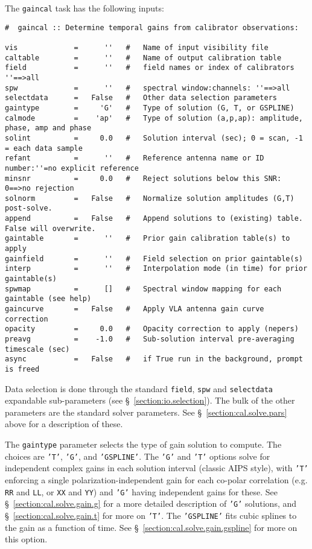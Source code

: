 The {\tt gaincal} task has the following inputs:
\small
\begin{verbatim}
#  gaincal :: Determine temporal gains from calibrator observations:

vis             =      ''   #   Name of input visibility file
caltable        =      ''   #   Name of output calibration table
field           =      ''   #   field names or index of calibrators ''==>all
spw             =      ''   #   spectral window:channels: ''==>all
selectdata      =   False   #   Other data selection parameters
gaintype        =     'G'   #   Type of solution (G, T, or GSPLINE)
calmode         =    'ap'   #   Type of solution (a,p,ap): amplitude, phase, amp and phase
solint          =     0.0   #   Solution interval (sec); 0 = scan, -1 = each data sample
refant          =      ''   #   Reference antenna name or ID number:''=no explicit reference
minsnr          =     0.0   #   Reject solutions below this SNR: 0==>no rejection
solnorm         =   False   #   Normalize solution amplitudes (G,T) post-solve.
append          =   False   #   Append solutions to (existing) table.  False will overwrite.
gaintable       =      ''   #   Prior gain calibration table(s) to apply
gainfield       =      ''   #   Field selection on prior gaintable(s)
interp          =      ''   #   Interpolation mode (in time) for prior gaintable(s)
spwmap          =      []   #   Spectral window mapping for each gaintable (see help)
gaincurve       =   False   #   Apply VLA antenna gain curve correction
opacity         =     0.0   #   Opacity correction to apply (nepers)
preavg          =    -1.0   #   Sub-solution interval pre-averaging timescale (sec)
async           =   False   #   if True run in the background, prompt is freed
\end{verbatim}
\normalsize
Data selection is done through the standard {\tt field}, {\tt spw} and 
{\tt selectdata} expandable sub-parameters (see \S~\ref{section:io.selection}).
The bulk of the other parameters are the standard solver parameters.  See
\S~\ref{section:cal.solve.pars} above for a description of these.

The {\tt gaintype} parameter selects the type of gain solution to
compute.  The choices are {\tt 'T'}, {\tt 'G'}, and {\tt 'GSPLINE'}.
The {\tt 'G'} and {\tt 'T'} options solve for independent complex
gains in each solution interval (classic AIPS style), with {\tt 'T'} 
enforcing a single polarization-independent gain for each co-polar
correlation (e.g. {\tt RR} and {\tt LL}, or {\tt XX} and {\tt YY})
and {\tt 'G'} having independent gains for these.  
See \S~\ref{section:cal.solve.gain.g} for a more detailed description
of {\tt 'G'} solutions, and \S~\ref{section:cal.solve.gain.t} for more
on {\tt 'T'}.  The {\tt 'GSPLINE'} fits cubic splines to the gain as
a function of time.  See \S~\ref{section:cal.solve.gain.gspline} for
more on this option.

